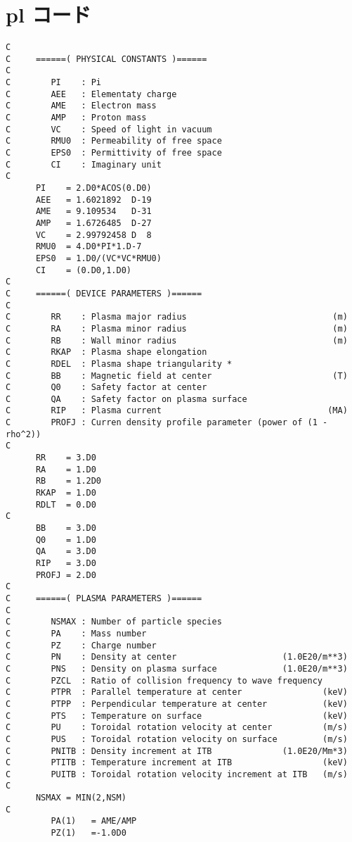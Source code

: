 \documentclass[11pt]{jarticle}
\begin{document}
\section{pl コード}
\begin{verbatim}
C
C     ======( PHYSICAL CONSTANTS )======
C
C        PI    : Pi
C        AEE   : Elementaty charge
C        AME   : Electron mass
C        AMP   : Proton mass
C        VC    : Speed of light in vacuum
C        RMU0  : Permeability of free space
C        EPS0  : Permittivity of free space
C        CI    : Imaginary unit
C
      PI    = 2.D0*ACOS(0.D0)
      AEE   = 1.6021892  D-19
      AME   = 9.109534   D-31
      AMP   = 1.6726485  D-27
      VC    = 2.99792458 D  8
      RMU0  = 4.D0*PI*1.D-7
      EPS0  = 1.D0/(VC*VC*RMU0)
      CI    = (0.D0,1.D0)
C
C     ======( DEVICE PARAMETERS )======
C
C        RR    : Plasma major radius                             (m)
C        RA    : Plasma minor radius                             (m)
C        RB    : Wall minor radius                               (m)
C        RKAP  : Plasma shape elongation
C        RDEL  : Plasma shape triangularity *
C        BB    : Magnetic field at center                        (T)
C        Q0    : Safety factor at center
C        QA    : Safety factor on plasma surface
C        RIP   : Plasma current                                 (MA)
C        PROFJ : Curren density profile parameter (power of (1 - rho^2))
C
      RR    = 3.D0
      RA    = 1.D0
      RB    = 1.2D0
      RKAP  = 1.D0
      RDLT  = 0.D0
C
      BB    = 3.D0
      Q0    = 1.D0
      QA    = 3.D0
      RIP   = 3.D0
      PROFJ = 2.D0
C
C     ======( PLASMA PARAMETERS )======
C
C        NSMAX : Number of particle species
C        PA    : Mass number
C        PZ    : Charge number
C        PN    : Density at center                     (1.0E20/m**3)
C        PNS   : Density on plasma surface             (1.0E20/m**3)
C        PZCL  : Ratio of collision frequency to wave frequency
C        PTPR  : Parallel temperature at center                (keV)
C        PTPP  : Perpendicular temperature at center           (keV)
C        PTS   : Temperature on surface                        (keV)
C        PU    : Toroidal rotation velocity at center          (m/s)
C        PUS   : Toroidal rotation velocity on surface         (m/s)
C        PNITB : Density increment at ITB              (1.0E20/Mm*3)
C        PTITB : Temperature increment at ITB                  (keV)
C        PUITB : Toroidal rotation velocity increment at ITB   (m/s)
C
      NSMAX = MIN(2,NSM)
C
         PA(1)   = AME/AMP
         PZ(1)   =-1.0D0

\end{verbatim}
\end{document}
